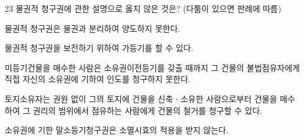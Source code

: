 \begin{question}{23}
물권적 청구권에 관한 설명으로 옳지 않은 것은? (다툼이 있으면 판례에 따름)
\begin{choices}
  \item 물권적 청구권은 물권과 분리하여 양도하지 못한다.
  \item 물권적 청구권을 보전하기 위하여 가등기를 할 수 있다.
  \item 미등기건물을 매수한 사람은 소유권이전등기를 갖출 때까지 그 건물의 불법점유자에게 직접 자신의 소유권에 기하여 인도를 청구하지 못한다.
  \item 토지소유자는 권원 없이 그의 토지에 건물을 신축ㆍ소유한 사람으로부터 건물을 매수하여 그 권리의 범위에서 점유하는 사람에게 건물의 철거를 청구할 수 있다.
  \item 소유권에 기한 말소등기청구권은 소멸시효의 적용을 받지 않는다.
\end{choices}
\end{question}
